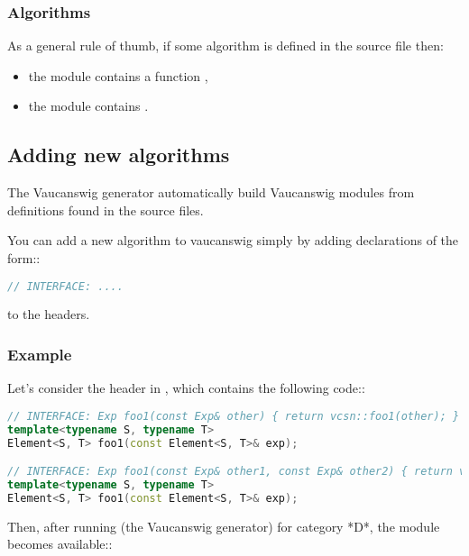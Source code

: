 \subsubsection{Algorithms}

As a  general rule of thumb,  if some algorithm   is defined in
the source file  then:

\begin{itemize}
\item the module  contains a function
  ,
\item the module  contains
  .
\end{itemize}


\subsection{Adding new algorithms}
The Vaucanswig  generator automatically build  Vaucanswig modules from
definitions found in the \Vauc source files.

You  can  add   a  new  algorithm  to  vaucanswig   simply  by  adding
declarations of the form::

\begin{lstlisting}[language=C++]
// INTERFACE: ....
\end{lstlisting}

to the \Vauc headers.


\subsubsection{Example}

Let's consider the \Vauc header  in
, which contains the following
code::

\begin{lstlisting}[language=C++]
// INTERFACE: Exp foo1(const Exp& other) { return vcsn::foo1(other); }
template<typename S, typename T>
Element<S, T> foo1(const Element<S, T>& exp);

// INTERFACE: Exp foo1(const Exp& other1, const Exp& other2) { return vcsn::foo2(other1, other2); }
template<typename S, typename T>
Element<S, T> foo1(const Element<S, T>& exp);  
\end{lstlisting}

Then,  after  running    (the Vaucanswig  generator)  for
category *D*, the module  becomes available::


